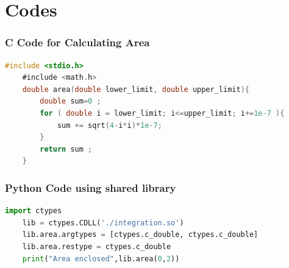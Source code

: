 \documentclass{beamer}
\theoremstyle{remark}
\numberwithin{equation}{section}
\begin{document}
\section{Codes}
\begin{frame}[fragile]
	\frametitle{C Code for Calculating Area}
	\begin{lstlisting}[language=C]
	#include <stdio.h>
	#include <math.h>
	double area(double lower_limit, double upper_limit){
		double sum=0 ;
		for ( double i = lower_limit; i<=upper_limit; i+=1e-7 ){
			sum += sqrt(4-i*i)*1e-7;
		}
		return sum ;
	}
	\end{lstlisting}
\end{frame}

\begin{frame}[fragile]
	\frametitle{Python Code using shared library}
	\begin{lstlisting}[language=Python]
	import ctypes
	lib = ctypes.CDLL('./integration.so')
	lib.area.argtypes = [ctypes.c_double, ctypes.c_double]
	lib.area.restype = ctypes.c_double
	print("Area enclosed",lib.area(0,2))
	\end{lstlisting}
\end{frame}
\end{document}
